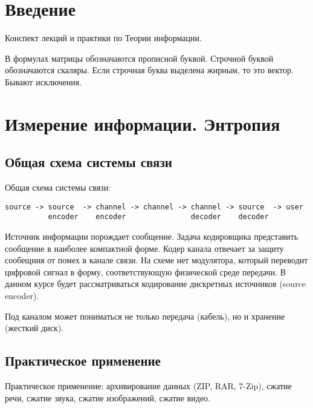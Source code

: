 




\section{Введение}

Конспект лекций и практики по Теории информации.

В формулах матрицы обозначаются прописной буквой. Строчной буквой обозначаются
скаляры. Если строчная буква выделена жирным, то это вектор. Бывают исключения.

\section{Измерение информации. Энтропия}

\subsection{Общая схема системы связи}

Общая схема системы связи:

\begin{verbatim}
source -> source  -> channel -> channel -> channel -> source  -> user
          encoder    encoder               decoder    decoder
\end{verbatim}

Источник информации порождает сообщение. Задача кодировщика представить
сообщение в наиболее компактной форме. Кодер канала отвечает за защиту
сообещния от помех в канале связи. На схеме нет модулятора, который переводит
цифровой сигнал в форму, соответствующую физической среде передачи. В данном
курсе будет рассматриваться кодирование дискретных источников (source encoder).

Под каналом может пониматься не только передача (кабель), но и хранение
(жесткий диск).

\subsection{Практическое применение}

Практическое применение: архивирование данных (ZIP, RAR, 7-Zip), сжатие речи,
сжатие звука, сжатие изображений, сжатие видео.

